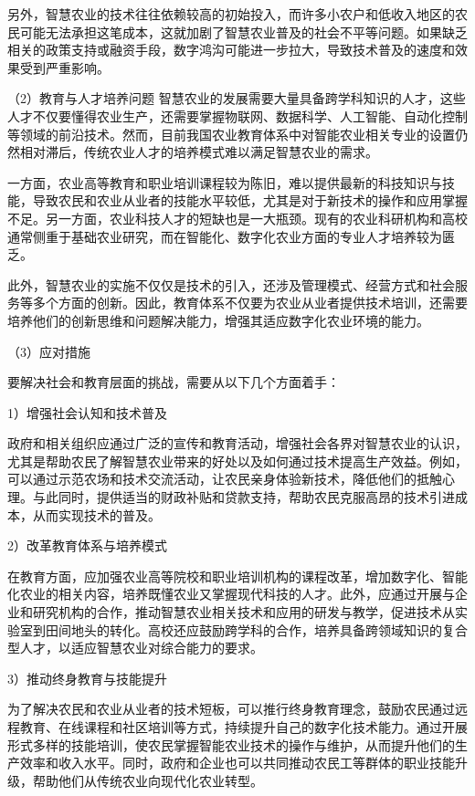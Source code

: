 另外，智慧农业的技术往往依赖较高的初始投入，而许多小农户和低收入地区的农民可能无法承担这笔成本，这就加剧了智慧农业普及的社会不平等问题。如果缺乏相关的政策支持或融资手段，数字鸿沟可能进一步拉大，导致技术普及的速度和效果受到严重影响。

（2）教育与人才培养问题
智慧农业的发展需要大量具备跨学科知识的人才，这些人才不仅要懂得农业生产，还需要掌握物联网、数据科学、人工智能、自动化控制等领域的前沿技术。然而，目前我国农业教育体系中对智能农业相关专业的设置仍然相对滞后，传统农业人才的培养模式难以满足智慧农业的需求。

一方面，农业高等教育和职业培训课程较为陈旧，难以提供最新的科技知识与技能，导致农民和农业从业者的技能水平较低，尤其是对于新技术的操作和应用掌握不足。另一方面，农业科技人才的短缺也是一大瓶颈。现有的农业科研机构和高校通常侧重于基础农业研究，而在智能化、数字化农业方面的专业人才培养较为匮乏。

此外，智慧农业的实施不仅仅是技术的引入，还涉及管理模式、经营方式和社会服务等多个方面的创新。因此，教育体系不仅要为农业从业者提供技术培训，还需要培养他们的创新思维和问题解决能力，增强其适应数字化农业环境的能力。

（3）应对措施

要解决社会和教育层面的挑战，需要从以下几个方面着手：

1）增强社会认知和技术普及

政府和相关组织应通过广泛的宣传和教育活动，增强社会各界对智慧农业的认识，尤其是帮助农民了解智慧农业带来的好处以及如何通过技术提高生产效益。例如，可以通过示范农场和技术交流活动，让农民亲身体验新技术，降低他们的抵触心理。与此同时，提供适当的财政补贴和贷款支持，帮助农民克服高昂的技术引进成本，从而实现技术的普及。

2）改革教育体系与培养模式

在教育方面，应加强农业高等院校和职业培训机构的课程改革，增加数字化、智能化农业的相关内容，培养既懂农业又掌握现代科技的人才。此外，应通过开展与企业和研究机构的合作，推动智慧农业相关技术和应用的研发与教学，促进技术从实验室到田间地头的转化。高校还应鼓励跨学科的合作，培养具备跨领域知识的复合型人才，以适应智慧农业对综合能力的要求。

3）推动终身教育与技能提升

为了解决农民和农业从业者的技术短板，可以推行终身教育理念，鼓励农民通过远程教育、在线课程和社区培训等方式，持续提升自己的数字化技术能力。通过开展形式多样的技能培训，使农民掌握智能农业技术的操作与维护，从而提升他们的生产效率和收入水平。同时，政府和企业也可以共同推动农民工等群体的职业技能升级，帮助他们从传统农业向现代化农业转型。

